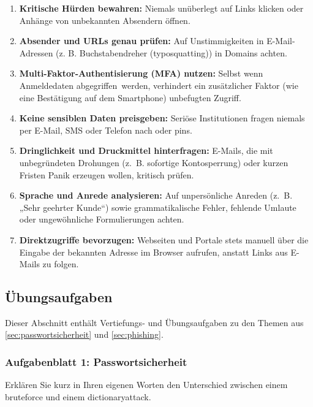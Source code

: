 \documentclass[12pt,a4paper]{article}
\newcounter{subsubsubsection}[subsubsection]
\begin{document}
\begin{enumerate}
    \item \textbf{Kritische Hürden bewahren:} Niemals unüberlegt auf Links klicken oder \mbox{Anhänge} von unbekannten Absendern öffnen.
    \item \textbf{Absender und URLs genau prüfen:} Auf Unstimmigkeiten in E-Mail-Adressen (z. B. Buchstabendreher (\gls{typosquatting})) in Domains achten.
    \item \textbf{Multi-Faktor-Authentisierung (MFA) nutzen:} Selbst wenn Anmeldedaten \mbox{abgegriffen werden}, verhindert ein zusätzlicher Faktor (wie eine Bestätigung auf dem Smartphone) unbefugten Zugriff.
    \item \textbf{Keine sensiblen Daten preisgeben:} Seriöse Institutionen fragen niemals per E-Mail, SMS oder Telefon nach  oder \gls{pin}s.
    \item \textbf{Dringlichkeit und Druckmittel hinterfragen:} E-Mails, die mit \mbox{unbegründeten} Drohungen (z.~B. sofortige Kontosperrung) oder kurzen Fristen Panik erzeugen \mbox{wollen}, kritisch prüfen.
    \item \textbf{Sprache und Anrede analysieren:} Auf unpersönliche Anreden (z.~B. „Sehr \mbox{geehrter} Kunde“) sowie grammatikalische Fehler, fehlende Umlaute oder \mbox{ungewöhnliche} Formulierungen achten.
    \item \textbf{Direktzugriffe bevorzugen:} Webseiten und Portale stets manuell über die \mbox{Eingabe} der bekannten Adresse im Browser aufrufen, anstatt Links aus E-Mails zu folgen.
\end{enumerate}

\newpage
\subsection{Übungsaufgaben}
\label{sec:aufgaben}

Dieser Abschnitt enthält Vertiefungs- und Übungsaufgaben zu den Themen aus \mbox{\cref{sec:passwortsicherheit}} und \mbox{\cref{sec:phishing}}.

\subsubsection{Aufgabenblatt 1: Passwortsicherheit}
\label{subsec:aufgaben_passwort}


\begin{taskbox}
Erklären Sie kurz in Ihren eigenen Worten den Unterschied zwischen einem \newline \gls{bruteforce} und einem \gls{dictionaryattack}.
\end{taskbox}
\end{document}
